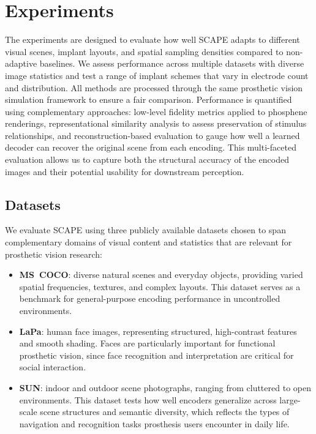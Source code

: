 \section{Experiments}
\label{sec:experiments}

The experiments are designed to evaluate how well SCAPE adapts to different visual scenes, implant layouts, and spatial sampling densities compared to non-adaptive baselines.  
We assess performance across multiple datasets with diverse image statistics and test a range of implant schemes that vary in electrode count and distribution.  
All methods are processed through the same prosthetic vision simulation framework to ensure a fair comparison.  
Performance is quantified using complementary approaches: low-level fidelity metrics applied to phosphene renderings, representational similarity analysis to assess preservation of stimulus relationships, and reconstruction-based evaluation to gauge how well a learned decoder can recover the original scene from each encoding.  
This multi-faceted evaluation allows us to capture both the structural accuracy of the encoded images and their potential usability for downstream perception.


\subsection{Datasets}
We evaluate SCAPE using three publicly available datasets chosen to span complementary domains of visual content and statistics that are relevant for prosthetic vision research:

\begin{itemize}
    \item \textbf{MS~COCO}: diverse natural scenes and everyday objects, providing varied spatial frequencies, textures, and complex layouts. This dataset serves as a benchmark for general-purpose encoding performance in uncontrolled environments.
    \item \textbf{LaPa}: human face images, representing structured, high-contrast features and smooth shading. Faces are particularly important for functional prosthetic vision, since face recognition and interpretation are critical for social interaction.
    \item \textbf{SUN}: indoor and outdoor scene photographs, ranging from cluttered to open environments. This dataset tests how well encoders generalize across large-scale scene structures and semantic diversity, which reflects the types of navigation and recognition tasks prosthesis users encounter in daily life.
\end{itemize}

